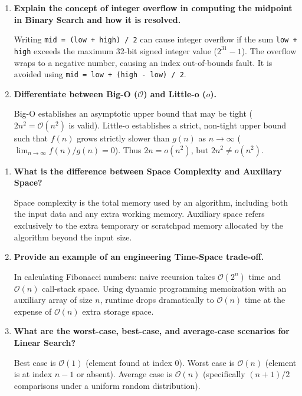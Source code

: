 \documentclass[12pt,a4paper]{article}
\newcommand{\Q}[1]{\textbf{#1}\par\noindent\ignorespaces}
\begin{document}
\begin{tcolorbox}[exambox, title={\textbf{Frequently Asked / Viva Questions (Part 1)}}]
\begin{enumerate}[topsep=0pt, label=\textbf{Q\arabic*.}, itemsep=4pt]
  \item \Q{Explain the concept of integer overflow in computing the midpoint in Binary Search and how it is resolved.}
  Writing \texttt{mid = (low + high) / 2} can cause integer overflow if the sum \texttt{low + high} exceeds the maximum 32-bit signed integer value ($2^{31}-1$). The overflow wraps to a negative number, causing an index out-of-bounds fault. It is avoided using \texttt{mid = low + (high - low) / 2}.

  \item \Q{Differentiate between Big-O ($\mathcal{O}$) and Little-o ($o$).}
  Big-O establishes an asymptotic upper bound that may be tight ($2n^2 = \mathcal{O}(n^2)$ is valid). Little-o establishes a strict, non-tight upper bound such that $f(n)$ grows strictly slower than $g(n)$ as $n \to \infty$ ($\lim_{n \to \infty} f(n)/g(n) = 0$). Thus $2n = o(n^2)$, but $2n^2 \ne o(n^2)$.
\end{enumerate}
\end{tcolorbox}

\newpage

\begin{tcolorbox}[exambox, title={\textbf{Frequently Asked / Viva Questions (Part 2)}}]
\begin{enumerate}[topsep=0pt, label=\textbf{Q\arabic*.}, itemsep=4pt, start=8]
  \item \Q{What is the difference between Space Complexity and Auxiliary Space?}
  Space complexity is the total memory used by an algorithm, including both the input data and any extra working memory. Auxiliary space refers exclusively to the extra temporary or scratchpad memory allocated by the algorithm beyond the input size.

  \item \Q{Provide an example of an engineering Time-Space trade-off.}
  In calculating Fibonacci numbers: naive recursion takes $\mathcal{O}(2^n)$ time and $\mathcal{O}(n)$ call-stack space. Using dynamic programming memoization with an auxiliary array of size $n$, runtime drops dramatically to $\mathcal{O}(n)$ time at the expense of $\mathcal{O}(n)$ extra storage space.

  \item \Q{What are the worst-case, best-case, and average-case scenarios for Linear Search?}
  Best case is $\mathcal{O}(1)$ (element found at index $0$). Worst case is $\mathcal{O}(n)$ (element is at index $n-1$ or absent). Average case is $\mathcal{O}(n)$ (specifically $(n+1)/2$ comparisons under a uniform random distribution).
\end{enumerate}
\end{tcolorbox}
\end{document}
